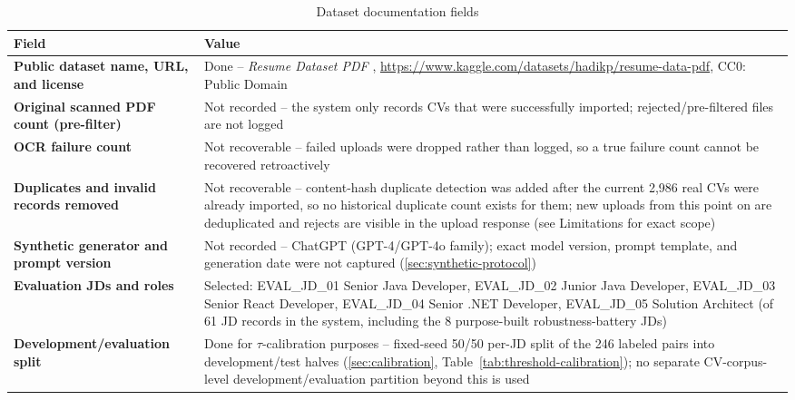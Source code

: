 \documentclass[12pt,a4paper,oneside]{report}
\begin{document}
\begin{table}[htbp]
\centering
\caption{Dataset documentation fields}
\label{tab:dataset-fields}
\begin{tabularx}{\textwidth}{>{\bfseries}p{}X}
\toprule
Field & Value \\
\midrule
Public dataset name, URL, and license & Done -- \emph{Resume Dataset PDF} \citep{hadikpresumepdf}, \url{https://www.kaggle.com/datasets/hadikp/resume-data-pdf}, CC0: Public Domain \\
Original scanned PDF count (pre-filter) & Not recorded -- the system only records CVs that were successfully imported; rejected/pre-filtered files are not logged \\
OCR failure count & Not recoverable -- failed uploads were dropped rather than logged, so a true failure count cannot be recovered retroactively \\
Duplicates and invalid records removed & Not recoverable -- content-hash duplicate detection was added after the current 2,986 real CVs were already imported, so no historical duplicate count exists for them; new uploads from this point on are deduplicated and rejects are visible in the upload response (see Limitations for exact scope) \\
Synthetic generator and prompt version & Not recorded -- ChatGPT (GPT-4/GPT-4o family); exact model version, prompt template, and generation date were not captured (\cref{sec:synthetic-protocol}) \\
Evaluation JDs and roles & Selected: EVAL\_JD\_01 Senior Java Developer, EVAL\_JD\_02 Junior Java Developer, EVAL\_JD\_03 Senior React Developer, EVAL\_JD\_04 Senior .NET Developer, EVAL\_JD\_05 Solution Architect (of 61 JD records in the system, including the 8 purpose-built robustness-battery JDs) \\
Development/evaluation split & Done for $\tau$-calibration purposes -- fixed-seed 50/50 per-JD split of the 246 labeled pairs into development/test halves (\cref{sec:calibration}, Table~\ref{tab:threshold-calibration}); no separate CV-corpus-level development/evaluation partition beyond this is used \\
\bottomrule
\end{tabularx}
\end{table}
\end{document}
